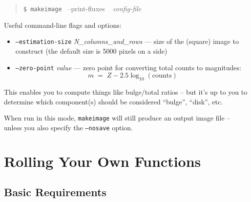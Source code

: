 \documentclass[10pt,a4paper,article]{memoir}
\newcommand{\makeimage}{\texttt{makeimage}}
\begin{document}
\begin{quote}
  \texttt{\$ \makeimage{} }  --print-fluxes ~ \textit{config-file}
\end{quote}

Useful command-line flags and options:
\begin{itemize}

\item \texttt{--estimation-size} \textit{N\_columns\_and\_rows} --- size of the
(square) image to construct (the default size is 5000 pixels on a side)

\item \texttt{--zero-point} \textit{value} --- zero point for converting total counts
to magnitudes:
\begin{equation}
m \; = \; Z - 2.5 \log_{10}( {\mathrm{counts}} )
\end{equation}

\end{itemize}

This enables you to compute things like bulge/total ratios -- but it's up to you
to determine which component(s) should be considered ``bulge'', ``disk'', etc.

When run in this mode, \makeimage{} will still produce an output image file --
unless you also specify the \texttt{--nosave} option.




\chapter{Rolling Your Own Functions}

\section{Basic Requirements}
\end{document}
